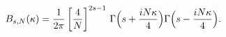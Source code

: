 \begin{equation}
B_{s,N}(\kappa)=\frac{1}{2\pi}\left[\frac{4}{N}\right]^{2s-1}\,
\Gamma\Bigl(s+\frac{iN\kappa}{4}\Bigr)\Gamma\Bigl(s-\frac{iN\kappa}{4}\Bigr).
\label{Bs}
\end{equation}


